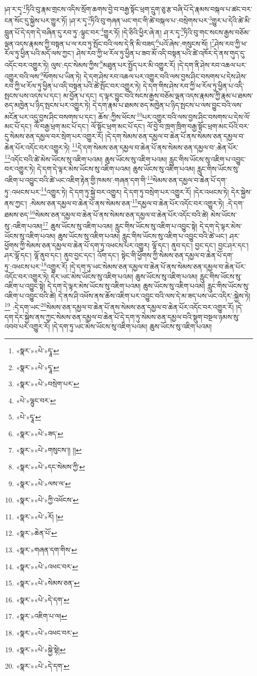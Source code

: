 །ཤ་ར་དྭ་\footnote{«སྣར་»«པེ་»དྭཱ་}ཏིའི་བུ་རྣམ་གྲངས་འདིས་སྲོག་ཆགས་བྱེ་བ་བརྒྱ་སྟོང་ཕྲག་དྲུག་ཅུ་རྩ་བཞི་པོ་དེ་རྣམས་བསྐལ་པ་ཚང་བར་ངན་སོང་དུ་སྐྱེས་པར་གྱུར་ཏོ། །ཤ་ར་དྭ་\footnote{«སྣར་»«པེ་»དྭཱ་}ཏིའི་བུ་གཞན་ཡང་གང་གི་ཚེ་བསྐལ་པ་:བསྲེགས་པར་\footnote{«སྣར་»«པེ་»བསྲེག་པར་}གྱུར་པ་དེའི་ཚེ་མི་བླུན་པོ་དེ་དག་དེ་བཞིན་དུ་རབ་ཏུ་:ལྟུང་བར་\footnote{«པེ་»ལྷུང་བར་}གྱུར་ཏོ། །དེ་ཅིའི་ཕྱིར་ཞེ་ན། ཤ་ར་དྭ་\footnote{«པེ་»དྭཱ་}ཏིའི་བུ་གང་སངས་རྒྱས་བཅོམ་ལྡན་འདས་རྣམས་ཀྱི་བསྟན་པ་ལ་རབ་ཏུ་སྤོང་བའི་ལས་དེ་ནི་མི་བཟད་\footnote{«སྣར་»«པེ་»ཟད་}པའོ་ཞེས་:གསུངས་སོ། །\footnote{«སྣར་»«པེ་»གསུངས་།། །།}ཤེས་རབ་ཀྱི་ཕ་རོལ་ཏུ་ཕྱིན་པའི་མདོ་ལས་ཀྱང་། ཤེས་རབ་ཀྱི་ཕ་རོལ་ཏུ་ཕྱིན་པ་ཟབ་མོ་འདི་བསྟན་པའི་ཚེ་འཁོར་དེ་ནས་གུད་དུ་འདོང་བར་འགྱུར་ཏེ། ལུས་:དང་སེམས་ཀྱིས་\footnote{«སྣར་»«པེ་»དང་སེམས་ཀྱི་}མཐུན་པར་སྤྱོད་པར་མི་འགྱུར་རོ། །དེ་དག་ནི་ཤེས་རབ་འཆལ་པར་འགྱུར་བའི་ལས་\footnote{«སྣར་»«པེ་»ལས་ལ་}སོགས་པ་ཡིན་ཏེ། དེ་དག་ཤེས་རབ་འཆལ་པར་འགྱུར་བའི་ལས་བྱས་ཤིང་བསགས་པ་དེས་ཤེས་རབ་ཀྱི་ཕ་རོལ་ཏུ་ཕྱིན་པ་འདི་བསྟན་པའི་ཚེ་སྤོང་བར་འགྱུར་ཏེ། དེ་དག་གིས་ཤེས་རབ་ཀྱི་ཕ་རོལ་ཏུ་ཕྱིན་པ་འདི་སྤངས་པས་འདས་པ་དང་། མ་བྱོན་པ་དང་། ད་ལྟར་བྱུང་བའི་སངས་རྒྱས་བཅོམ་ལྡན་འདས་རྣམས་ཀྱི་རྣམ་པ་ཐམས་ཅད་མཁྱེན་པ་ཉིད་སྤངས་པར་འགྱུར་ཏེ། དེ་དག་རྣམ་པ་ཐམས་ཅད་མཁྱེན་པ་ཉིད་སྤངས་པ་ལས་བྱུང་བའི་ལས་མངོན་པར་འདུ་བྱས་ཤིང་བསགས་པ་དང་། ཆོས་:ཀྱིས་ཕོངས་\footnote{«སྣར་»«པེ་»ཀྱི་འཕོངས་}པར་འགྱུར་བའི་ལས་བྱས་ཤིང་བསགས་པ་དེས་ལོ་མང་པོ་དང་། ལོ་བརྒྱ་ཕྲག་མང་པོ་དང་། ལོ་སྟོང་ཕྲག་མང་པོ་དང་། ལོ་བྱེ་བ་ཁྲག་ཁྲིག་བརྒྱ་སྟོང་ཕྲག་མང་པོའི་བར་དུ་སེམས་ཅན་དམྱལ་བར་སྲེག་པར་འགྱུར་རོ། །དེ་དག་སེམས་ཅན་དམྱལ་བ་ཆེན་པོ་ནས་སེམས་ཅན་དམྱལ་བ་ཆེན་པོར་འདོང་བར་འགྱུར་ཏེ། \footnote{«སྣར་»«པེ་»རོ། ། }དེ་དག་སེམས་ཅན་དམྱལ་བ་ཆེན་པོ་ནས་སེམས་ཅན་དམྱལ་བ་:ཆེན་པོར་\footnote{«སྣར་»ཆེན་པོ་}འདོང་བའི་ཚེ་མེས་ཡོངས་སུ་འཇིག་པའམ། ཆུས་ཡོངས་སུ་འཇིག་པའམ། རླུང་གིས་ཡོངས་སུ་འཇིག་པ་འབྱུང་བར་འགྱུར་ཏེ། དེ་དག་དེ་ལྟར་མེས་ཡོངས་སུ་འཇིག་པའམ། ཆུས་ཡོངས་སུ་འཇིག་པའམ། རླུང་གིས་ཡོངས་སུ་འཇིག་པ་འབྱུང་བའི་ཚེ་ཡང་འཇིག་རྟེན་གྱི་ཁམས་:གཞན་དག་གི་\footnote{«སྣར་»གཞན་དག་གིས་}སེམས་ཅན་དམྱལ་བ་ཆེན་པོ་དག་ཏུ་:འཕངས་པར་\footnote{«སྣར་»«པེ་»འཕང་བར་}འགྱུར་ཏེ། དེ་དག་ཏུ་སྐྱེ་བར་འགྱུར། དེ་དག་ཏུ་བསྲེག་པར་འགྱུར་རོ། །དེར་འཕངས་ཏེ། དེར་སྐྱེས་ནས་ཀྱང་། :སེམས་ཅན་དམྱལ་བ་ཆེན་པོ་ནས་སེམས་ཅན་\footnote{«སྣར་»«པེ་»སེམས་ཅན་}དམྱལ་བ་ཆེན་པོར་འདོང་བར་འགྱུར་ཏེ། :དེ་དག་ཐམས་ཅད་\footnote{«སྣར་»«པེ་»དེ་དག་}སེམས་ཅན་དམྱལ་བ་ཆེན་པོ་ནས་སེམས་ཅན་དམྱལ་བ་ཆེན་པོར་འདོང་བའི་ཚེ། མེས་ཡོངས་སུ་:འཇིག་པའམ།\footnote{«སྣར་»འཇིག་པ་ལ།} ཆུས་ཡོངས་སུ་འཇིག་པའམ། རླུང་གིས་ཡོངས་སུ་འཇིག་པ་འབྱུང་སྟེ། དེ་དག་དེ་ལྟར་མེས་ཡོངས་སུ་འཇིག་པའམ། ཆུས་ཡོངས་སུ་འཇིག་པའམ། རླུང་གིས་ཡོངས་སུ་འཇིག་པ་འབྱུང་བའི་ཚེ་ཡང་། ཤར་ཕྱོགས་ཀྱི་སེམས་ཅན་དམྱལ་བ་ཆེན་པོ་དག་ཏུ་འཕངས་པར་འགྱུར། ལྷོ་དང་། ནུབ་དང་། བྱང་དང་། བྱང་ཤར་དང་། ཤར་ལྷོ་དང་། ལྷོ་ནུབ་དང་། ནུབ་བྱང་དང་། འོག་དང་། སྟེང་གི་ཕྱོགས་ཀྱི་སེམས་ཅན་དམྱལ་བ་ཆེན་པོ་དག་ཏུ་:འཕངས་པར་\footnote{«སྣར་»«པེ་»འཕང་བར་}འགྱུར་རོ། །དེ་དག་ཏུ་ཡང་སེམས་ཅན་དམྱལ་བ་ཆེན་པོ་ནས་སེམས་ཅན་དམྱལ་བ་ཆེན་པོར་འདོང་བར་འགྱུར་ཏེ། དེར་ཡང་མེས་ཡོངས་སུ་འཇིག་པའམ། ཆུས་ཡོངས་སུ་འཇིག་པའམ། རླུང་གིས་ཡོངས་སུ་འཇིག་པ་འབྱུང་སྟེ། དེ་དག་དེ་ལྟར་མེས་ཡོངས་སུ་འཇིག་པའམ། ཆུས་ཡོངས་སུ་འཇིག་པའམ། རླུང་གིས་ཡོངས་སུ་འཇིག་པ་འབྱུང་བའི་ཚེ། དེ་ནས་ཤི་འཕོས་ནས་ཆོས་འཇིག་པར་འབྱུང་བའི་ལས་དེ་མ་ཟད་པས་ཡང་འདིར་:སྐྱེས་ཏེ།\footnote{«སྣར་»«པེ་»སྐྱེ་སྟེ།} :དེ་དག་ཡང་\footnote{«སྣར་»«པེ་»དེ་དག་}སེམས་ཅན་དམྱལ་བ་ཆེན་པོ་ནས་སེམས་ཅན་དམྱལ་བ་ཆེན་པོར་འདོང་བར་འགྱུར་རོ། །དེ་དག་དེར་སྐྱེས་ནས་ཀྱང་སེམས་ཅན་དམྱལ་བ་ཆེན་པོ་དེ་དག་ཏུ་སེམས་ཅན་དམྱལ་བའི་སྡུག་བསྔལ་ཉམས་སུ་འབབ་པར་འགྱུར་རོ། །དེ་དག་ཏུ་ཡང་མེས་ཡོངས་སུ་འཇིག་པའམ། ཆུས་ཡོངས་སུ་འཇིག་པའམ། 